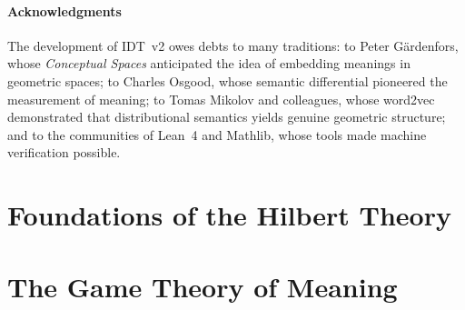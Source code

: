 \documentclass[11pt,openany]{book}
\theoremstyle{definition}
\theoremstyle{plain}
\theoremstyle{remark}
\begin{document}
\subsection*{Acknowledgments}

The development of IDT~v2 owes debts to many traditions: to Peter G\"ardenfors,
whose \emph{Conceptual Spaces} anticipated the idea of embedding meanings in
geometric spaces; to Charles Osgood, whose semantic differential pioneered the
measurement of meaning; to Tomas Mikolov and colleagues, whose word2vec
demonstrated that distributional semantics yields genuine geometric structure;
and to the communities of Lean~4 and Mathlib, whose tools made machine
verification possible.

\clearpage

\setcounter{tocdepth}{2}
\tableofcontents

\clearpage

\mainmatter

\part{Foundations of the Hilbert Theory}
\label{part:foundations}







\part{The Game Theory of Meaning}
\label{part:game-theory}







\end{document}
